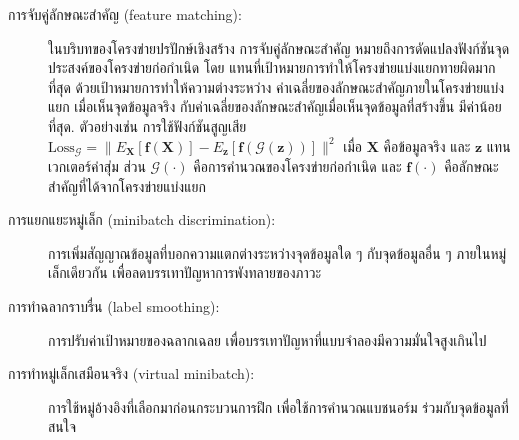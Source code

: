 \begin{description}
\item[การจับคู่ลักษณะสำคัญ (feature matching):]
ในบริบทของโครงข่ายปรปักษ์เชิงสร้าง
การจับคู่ลักษณะสำคัญ หมายถึงการดัดแปลงฟังก์ชันจุดประสงค์ของโครงข่ายก่อกำเนิด โดย แทนที่เป้าหมายการทำให้โครงข่ายแบ่งแยกทายผิดมากที่สุด 
ด้วยเป้าหมายการทำให้ความต่างระหว่าง
ค่าเฉลี่ยของลักษณะสำคัญภายในโครงข่ายแบ่งแยก เมื่อเห็นจุดข้อมูลจริง 
กับค่าเฉลี่ยของลักษณะสำคัญเมื่อเห็นจุดข้อมูลที่สร้างขึ้น
มีค่าน้อยที่สุด.
ตัวอย่างเช่น การใช้ฟังก์ชันสูญเสีย $\mathrm{Loss}_{\mathcal{G}} = \| E_{\bm{X}}[ \bm{f}(\bm{X})] -  E_{\bm{z}}[ \bm{f}(\mathcal{G}(\bm{z}))]\|^2$ เมื่อ $\bm{X}$ คือข้อมูลจริง
และ $\bm{z}$ แทนเวกเตอร์ค่าสุ่ม
ส่วน $\mathcal{G}(\cdot)$ คือการคำนวณของโครงข่ายก่อกำเนิด
และ $\bm{f}(\cdot)$ คือลักษณะสำคัญที่ได้จากโครงข่ายแบ่งแยก 

\item[การแยกแยะหมู่เล็ก (minibatch discrimination):]
การเพิ่มสัญญาณข้อมูลที่บอกความแตกต่างระหว่างจุดข้อมูลใด ๆ กับจุดข้อมูลอื่น ๆ ภายในหมู่เล็กเดียวกัน
เพื่อลดบรรเทาปัญหาการพังทลายของภาวะ

\item[การทำฉลากราบรื่น (label smoothing):]
การปรับค่าเป้าหมายของฉลากเฉลย เพื่อบรรเทาปัญหาที่แบบจำลองมีความมั่นใจสูงเกินไป



\item[การทำหมู่เล็กเสมือนจริง (virtual minibatch):]
การใช้หมู่อ้างอิงที่เลือกมาก่อนกระบวนการฝึก เพื่อใช้การคำนวณแบชนอร์ม ร่วมกับจุดข้อมูลที่สนใจ
	
\end{description}



